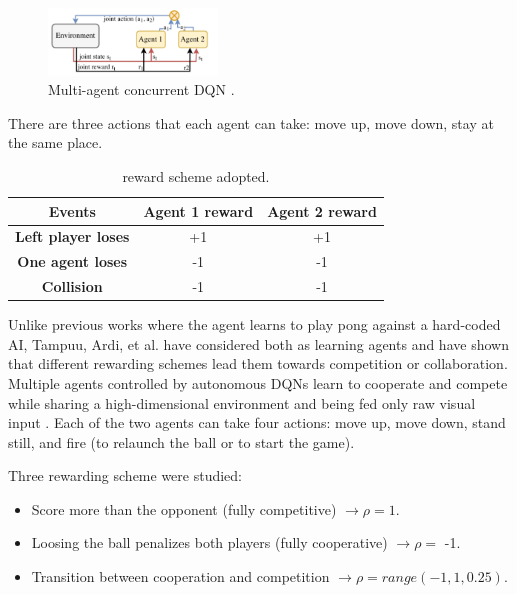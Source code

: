 \begin{figure}[ht]
  \centering
  \includegraphics[width=0.4\textwidth]{images/DQN_MAS.png}
  \caption{Multi-agent concurrent DQN \cite{diallo2017learning}.}
  \label{fig:dqnmas}
\end{figure}

There are three actions that each agent can take: move up, move down, stay at the same place.

\begin{table}[ht]
  \renewcommand{\arraystretch}{1.3}
  \caption{reward scheme adopted.}
  \label{tab:reward-scheme}
  \centering
  \begin{tabular}{@{}ccc@{}}
    \toprule
    \textbf{Events}            & \textbf{Agent 1 reward} & \textbf{Agent 2 reward} \\ \midrule
    \textbf{Left player loses} & +1                      & +1                      \\
    \textbf{One agent loses}   & -1                      & -1                      \\
    \textbf{Collision}         & -1                      & -1                      \\ \bottomrule
  \end{tabular}
\end{table}

\noindent
Unlike previous works where the agent learns to play pong against a hard-coded AI, 
Tampuu, Ardi, et al. \cite{tampuu2017multiagent} have considered both as learning agents and have shown that different rewarding schemes lead them towards competition or collaboration.
%
Multiple agents controlled by autonomous DQNs learn to cooperate and compete while sharing a high-dimensional environment and being fed only raw visual input \cite{tampuu2017multiagent}.
%
Each of the two agents can take four actions: 
move up, move down, stand still, and fire (to relaunch the ball or to start the game).
%

\noindent
Three rewarding scheme were studied:
\begin{itemize}
  \item Score more than the opponent (fully competitive) $\rightarrow \rho = 1$.
  \item Loosing the ball penalizes both players (fully cooperative) $\rightarrow \rho = $ -1.
  \item Transition between cooperation and competition $\rightarrow \rho = range(-1, 1, 0.25)$.
\end{itemize}

